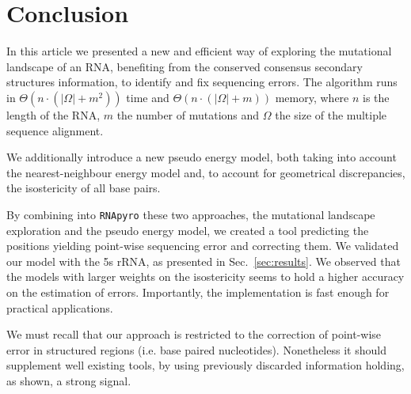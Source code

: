 \section{Conclusion}
\label{sec:conclusion}

In this article we presented a new and efficient way of
exploring the mutational landscape of an RNA, benefiting from the
 conserved consensus secondary structures  information,
to identify and fix sequencing errors. The algorithm runs in  $\Theta(n\cdot(|\Omega|+m^2))$ time and $\Theta(n\cdot(|\Omega|+m))$ memory, where $n$ is the length of the RNA,
$m$ the number of mutations and $\Omega$ the size of the multiple sequence alignment.

We additionally introduce a new
 pseudo energy model, both taking into account the nearest-neighbour energy model 
and, to account for geometrical discrepancies,  the isostericity of all base pairs. 

By combining  into \texttt{RNApyro} these two approaches,  the 
mutational landscape exploration and the pseudo energy model,
 we created a tool predicting the positions
 yielding point-wise sequencing error and correcting them.
We validated our model with the 5s rRNA,
as presented in Sec.~\ref{sec:results}.
We observed that the models
with larger weights on the
isostericity seems to hold a higher accuracy on the estimation of errors.
Importantly, the implementation is fast enough for practical applications. 


We must recall that our approach is restricted to
 the correction of point-wise error in structured regions (i.e. base paired nucleotides).
 Nonetheless it should supplement well existing tools, by using previously discarded
information holding, as shown, a strong signal.

